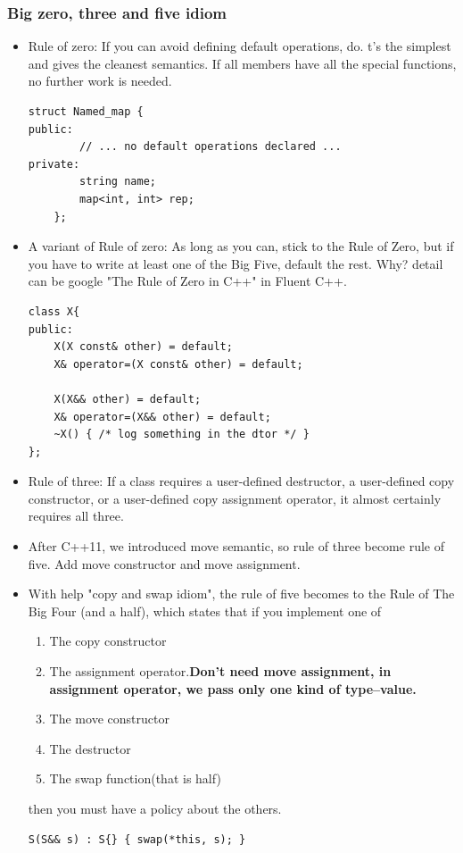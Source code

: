 \documentclass[a4paper,11pt,twoside]{book}
\begin{document}
\subsubsection{Big zero, three and five idiom}
\begin{itemize}
	
	\item Rule of zero: If you can avoid defining default operations, do. t’s the simplest and gives the cleanest semantics. If all members have all the special functions, no further work is needed.
	
\begin{lstlisting}
struct Named_map {
public:
		// ... no default operations declared ...
private:
		string name;
		map<int, int> rep;
	};
\end{lstlisting}

	\item A variant of Rule of zero: As long as you can, stick to the Rule of Zero, but if you have to write at least one of the Big Five, default the rest. Why? detail can be google "The Rule of Zero in C++" in Fluent C++.
	 
\begin{lstlisting}
class X{
public:
	X(X const& other) = default;
	X& operator=(X const& other) = default;
	
	X(X&& other) = default;
	X& operator=(X&& other) = default;
	~X() { /* log something in the dtor */ }
};
\end{lstlisting}

	\item Rule of three: If a class requires a user-defined destructor, a user-defined copy constructor, or a user-defined copy assignment operator, it almost certainly requires all three.
	
	\item After C++11, we introduced move semantic, so rule of three become rule of five. Add move constructor and move assignment.
	
	
	\item With help "copy and swap idiom", the rule of five becomes to the Rule of The Big Four (and a half), which states that if you implement one of
	\begin{enumerate}
		\item The copy constructor
		\item The assignment operator.\textbf{Don't need move assignment, in assignment operator, we pass only one kind of type--value.} 
		\item The move constructor
		\item The destructor
		\item The swap function(that is half)
	\end{enumerate}
	then you must have a policy about the others.
\begin{lstlisting}[numbers=none]
S(S&& s) : S{} { swap(*this, s); }


\end{lstlisting}
\end{itemize}
\end{document}
